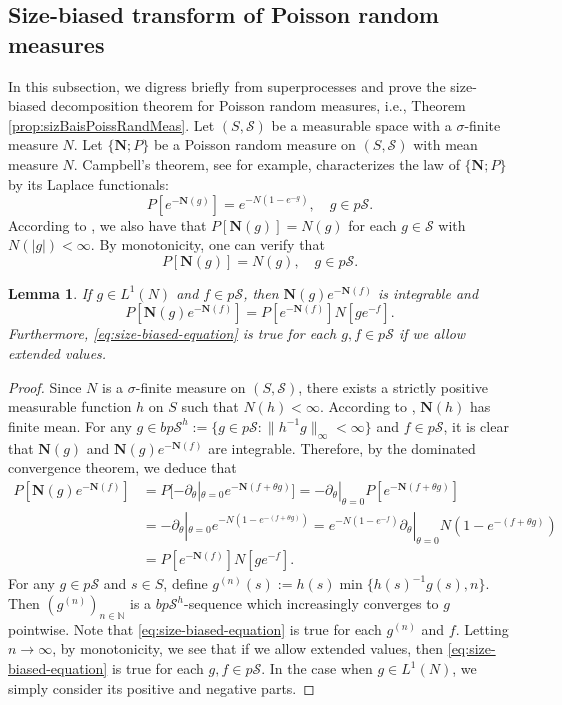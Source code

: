 \documentclass[UTF8]{pkuthss}
\theoremstyle{plain}
\newtheorem{lem}[thm]{Lemma}
\theoremstyle{definition}
\numberwithin{equation}{section}
\begin{document}
\subsection{Size-biased transform of Poisson random measures}
	In this subsection, we digress briefly from superprocesses and
   prove the size-biased decomposition theorem for Poisson random measures,
	i.e., Theorem \ref{prop:sizBaisPoissRandMeas}.
	Let $(S, \mathscr S)$ be a measurable space with a $\sigma$-finite measure $N$.
Let $\{\mathbf N; P\}$ be a Poisson random measure on $(S, \mathscr S)$ with mean measure $N$.
	Campbell's theorem, see \cite[Proof of Theorem 2.7]{Kyprianou2014Fluctuations} for example,
characterizes the law of $\{ \mathbf N; P \}$ by its Laplace functionals:
\[
	P [e^{-\mathbf N(g)}]
	= e^{-N(1 - e^{-g})},
	\quad g\in p\mathscr S.
\]
	According to \cite[Theorem 2.7]{Kyprianou2014Fluctuations}, we also have that $P [\mathbf N(g)] = N(g)$ for each $g\in \mathscr S$ with $N(|g|) < \infty.$
	By monotonicity, one can verify that
\[
	P [\mathbf N(g)] = N(g),
	\quad g\in p\mathscr S.
\]
\begin{lem}\label{lem:size-biased-lemma}
	If $g\in L^1(N)$ and $ f\in p\mathscr S$, then $\mathbf N(g) e^{-\mathbf N(f)}$ is integrable and
\begin{equation}\label{eq:size-biased-equation}
	P[\mathbf N(g) e^{-\mathbf N(f)}]
	= P[e^{-\mathbf N(f)}] N[g e^{-f}].
\end{equation}
	Furthermore, \eqref{eq:size-biased-equation} is true for each $g,f\in p\mathscr S$ if we allow extended values.	
\end{lem}
\begin{proof}
	Since $N$ is a $\sigma$-finite measure on $(S, \mathscr S)$, there exists a strictly positive measurable function $h$ on $S$ such that $N(h)<\infty$.
	According to \cite[Theorem 2.7.]{Kyprianou2014Fluctuations}, $\mathbf N(h)$ has finite mean.
	For any $g\in bp\mathscr S^h :=\{g\in p\mathscr S: \|h^{-1}g\|_\infty <\infty\}$ and $f\in p\mathscr S$, it is clear that $\mathbf N(g)$ and $\mathbf N(g)e^{-\mathbf N(f)}$ are integrable.
	Therefore, by the dominated convergence theorem, we deduce that
\[\begin{split}
	P[\mathbf N(g) e^{-\mathbf N(f)}]
	&=P[-\partial_\theta|_{\theta=0} e^{-\mathbf N(f+\theta g)}]
	= -\partial_\theta|_{\theta=0} P[e^{-\mathbf N(f+\theta g)}]\\
	&= -\partial_\theta|_{\theta=0} e^{-N(1-e^{-(f+\theta g)})}
	= e^{- N(1-e^{-f})} \partial_\theta|_{\theta=0}N(1-e^{-(f+\theta g)})\\
	&= P[e^{-\mathbf N(f)}]N[ge^{-f}].
\end{split}\]
	For any $g\in p\mathscr S$ and $s\in S$, define $g^{(n)}(s) := h(s) \min\{h(s)^{-1}g(s),n\}$.
	Then $(g^{(n)})_{n\in \mathbb N}$ is a $bp\mathscr S^h$-sequence which increasingly
	converges to $g$ pointwise.
	Note that \eqref{eq:size-biased-equation} is true for each $g^{(n)}$ and $f$.
	Letting $n\to\infty$, by monotonicity, we see that if we allow extended values, then \eqref{eq:size-biased-equation} is true for each $g,f\in p\mathscr S$.
	In the case when $g\in L^1(N)$, we simply consider its positive and negative parts.
\end{proof}
\end{document}
